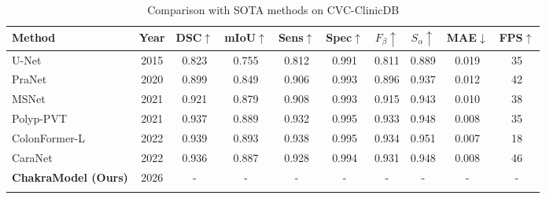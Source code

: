 \begin{table}[t]
\centering
\caption{Comparison with SOTA methods on CVC-ClinicDB}
\label{tab:sota}
\begin{tabular}{lccccccccc}
\hline
Method & Year & DSC$\uparrow$ & mIoU$\uparrow$ & Sens$\uparrow$ & Spec$\uparrow$ & $F_\beta\uparrow$ & $S_\alpha\uparrow$ & MAE$\downarrow$ & FPS$\uparrow$ \\
\hline
U-Net & 2015 & 0.823 & 0.755 & 0.812 & 0.991 & 0.811 & 0.889 & 0.019 & 35 \\
PraNet & 2020 & 0.899 & 0.849 & 0.906 & 0.993 & 0.896 & 0.937 & 0.012 & 42 \\
MSNet & 2021 & 0.921 & 0.879 & 0.908 & 0.993 & 0.915 & 0.943 & 0.010 & 38 \\
Polyp-PVT & 2021 & 0.937 & 0.889 & 0.932 & 0.995 & 0.933 & 0.948 & 0.008 & 35 \\
ColonFormer-L & 2022 & 0.939 & 0.893 & 0.938 & 0.995 & 0.934 & 0.951 & 0.007 & 18 \\
CaraNet & 2022 & 0.936 & 0.887 & 0.928 & 0.994 & 0.931 & 0.948 & 0.008 & 46 \\
\hline
\textbf{ChakraModel (Ours)} & 2026 & - & - & - & - & - & - & - & - \\\\
\hline
\end{tabular}
\end{table}